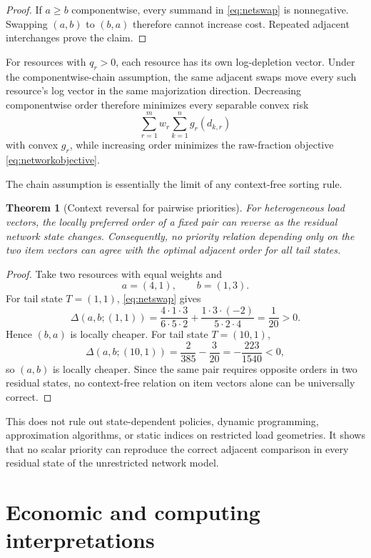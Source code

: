 \documentclass[pdflatex,iicol,sn-basic]{sn-jnl}
\theoremstyle{thmstyleone}
\newtheorem{theorem}{Theorem}[section]
\theoremstyle{thmstyletwo}
\theoremstyle{thmstylethree}
\begin{document}
\begin{proof}
If \(a\ge b\) componentwise, every summand in \eqref{eq:netswap} is nonnegative.
Swapping \((a,b)\) to \((b,a)\) therefore cannot increase cost. Repeated
adjacent interchanges prove the claim.
\end{proof}

For resources with \(q_r>0\), each resource has its own log-depletion vector.
Under the componentwise-chain assumption, the same adjacent swaps move every
such resource's log vector in the same majorization direction. Decreasing
componentwise order therefore minimizes every separable convex risk
\[
\sum_{r=1}^m w_r\sum_{k=1}^n g_r(d_{k,r})
\]
with convex \(g_r\), while increasing order minimizes the raw-fraction objective
\eqref{eq:networkobjective}.

The chain assumption is essentially the limit of any context-free sorting rule.

\begin{theorem}[Context reversal for pairwise priorities]
\label{thm:reversal}
For heterogeneous load vectors, the locally preferred order of a fixed pair can
reverse as the residual network state changes. Consequently, no priority
relation depending only on the two item vectors can agree with the optimal
adjacent order for all tail states.
\end{theorem}

\begin{proof}
Take two resources with equal weights and
\[
a=(4,1),\qquad b=(1,3).
\]
For tail state \(T=(1,1)\), \eqref{eq:netswap} gives
\[
\Delta(a,b;(1,1))
=
\frac{4\cdot1\cdot3}{6\cdot5\cdot2}
+
\frac{1\cdot3\cdot(-2)}{5\cdot2\cdot4}
=
\frac1{20}>0.
\]
Hence \((b,a)\) is locally cheaper. For tail state \(T=(10,1)\),
\[
\Delta(a,b;(10,1))
=
\frac{2}{385}-\frac3{20}
=-\frac{223}{1540}<0,
\]
so \((a,b)\) is locally cheaper. Since the same pair requires opposite orders in
two residual states, no context-free relation on item vectors alone can be
universally correct.
\end{proof}

This does not rule out state-dependent policies, dynamic programming,
approximation algorithms, or static indices on restricted load geometries. It
shows that no scalar priority can reproduce the correct adjacent comparison in
every residual state of the unrestricted network model.

\section{Economic and computing interpretations}
\label{sec:applications}
\end{document}
